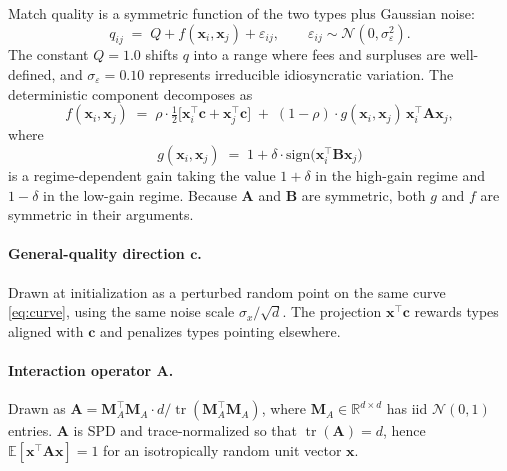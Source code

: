 \documentclass[11pt]{article}
\providecommand{\cref}[1]{\ref{#1}}
\newcommand{\x}{\mathbf{x}}
\newcommand{\A}{\mathbf{A}}
\newcommand{\B}{\mathbf{B}}
\newcommand{\R}{\mathbb{R}}
\DeclareMathOperator{\tr}{tr}
\begin{document}
Match quality is a symmetric function of the two types plus Gaussian noise:
\begin{equation}
q_{ij} \;=\; Q + f(\x_i,\x_j) + \varepsilon_{ij},\qquad \varepsilon_{ij}\sim\mathcal{N}(0,\sigma_\varepsilon^2).
\label{eq:match-output}
\end{equation}
The constant $Q=1.0$ shifts $q$ into a range where fees and surpluses are well-defined, and $\sigma_\varepsilon=0.10$ represents irreducible idiosyncratic variation. The deterministic component decomposes as
\begin{equation}
f(\x_i,\x_j) \;=\; \rho\cdot\tfrac{1}{2}\bigl[\x_i^\top\mathbf{c} + \x_j^\top\mathbf{c}\bigr] \;+\; (1-\rho)\cdot g(\x_i,\x_j)\,\x_i^\top\A\x_j,
\label{eq:f}
\end{equation}
where
\begin{equation}
g(\x_i,\x_j) \;=\; 1 + \delta\cdot\mathrm{sign}\!\bigl(\x_i^\top \B\x_j\bigr)
\label{eq:gain}
\end{equation}
is a regime-dependent gain taking the value $1+\delta$ in the high-gain regime and $1-\delta$ in the low-gain regime. Because $\A$ and $\B$ are symmetric, both $g$ and $f$ are symmetric in their arguments.

\paragraph{General-quality direction $\mathbf{c}$.} Drawn at initialization as a perturbed random point on the same curve \cref{eq:curve}, using the same noise scale $\sigma_x/\sqrt d$. The projection $\x^\top\mathbf{c}$ rewards types aligned with $\mathbf{c}$ and penalizes types pointing elsewhere.

\paragraph{Interaction operator $\A$.} Drawn as $\A = \mathbf{M}_A^\top\mathbf{M}_A\cdot d/\tr(\mathbf{M}_A^\top\mathbf{M}_A)$, where $\mathbf{M}_A \in \R^{d\times d}$ has iid $\mathcal{N}(0,1)$ entries. $\A$ is SPD and trace-normalized so that $\tr(\A)=d$, hence $\mathbb{E}[\x^\top\A\x]=1$ for an isotropically random unit vector $\x$.
\end{document}
